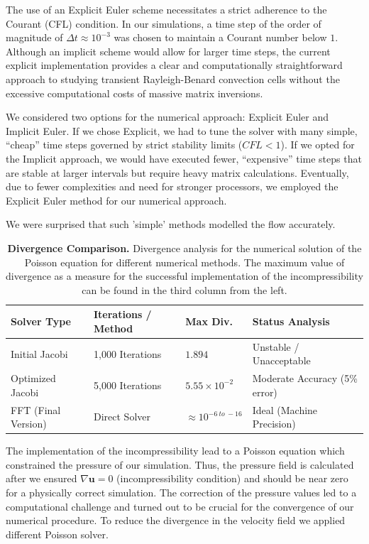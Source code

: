 The use of an Explicit Euler scheme necessitates a strict adherence to the Courant (CFL) condition. In our simulations, a time step of the order of magnitude of $\Delta t \approx 10^{-3}$ was chosen to maintain a Courant number below ${1}$. Although an implicit scheme would allow for larger time steps, the current explicit implementation provides a clear and computationally straightforward approach to studying transient Rayleigh-Benard convection cells without the excessive computational costs of massive matrix inversions.

We considered two options for the numerical approach: Explicit Euler and Implicit Euler. If we chose Explicit, we had to tune the solver with many simple, ``cheap'' time steps governed by strict stability limits ($CFL < 1$). If we opted for the Implicit approach, we would have executed fewer, ``expensive'' time steps that are stable at larger intervals but require heavy matrix calculations. Eventually, due to fewer complexities and need for stronger processors, we employed the Explicit Euler method for our numerical approach.

We were surprised that such 'simple' methods modelled the flow accurately.


\begin{table}[H]
    
    \centering
    
    \begin{tabular}{llll}
        \toprule
        \textbf{Solver Type} & \textbf{Iterations / Method} & \textbf{Max Div.} & \textbf{Status Analysis} \\
        \midrule
        Initial Jacobi      & 1,000 Iterations & $1.894$                   & Unstable / Unacceptable \\
        Optimized Jacobi    & 5,000 Iterations & $5.55 \times 10^{-2}$     & Moderate Accuracy (5\% error) \\
        FFT (Final Version) & Direct Solver    & $\approx 10^{{-6\:to \:-16}}$    & Ideal (Machine Precision) \\
        \bottomrule
    \end{tabular}
    \caption[Divergence Comparison]{\textbf{Divergence Comparison.} Divergence analysis for the numerical solution of the Poisson equation for different numerical methods. The maximum value of divergence as a measure for the successful implementation of the incompressibility can be found in the third column from the left.}
    \label{tab:divcomparison}
\end{table}
The implementation of the incompressibility lead to a Poisson equation which constrained the pressure of our simulation.
Thus, the pressure field is calculated after we ensured $\nabla \textbf{u} = 0$ (incompressibility condition) and should be near zero for a physically correct simulation.
The correction of the pressure values led to a computational challenge and turned out to be crucial for the convergence of our numerical procedure.
To reduce the divergence in the velocity field we applied different Poisson solver.
 
